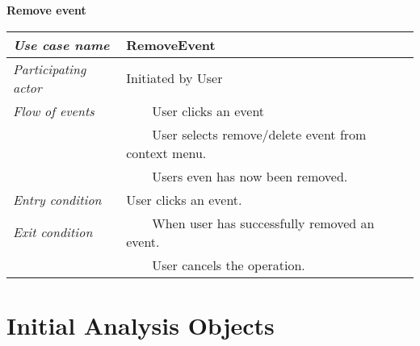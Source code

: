 \documentclass[10pt]{report}
\newcommand{\tabitem}{~~\llap{\textbullet}~~}
\numberwithin{equation}{section} %
\numberwithin{figure}{section} %
\numberwithin{table}{section} %
\begin{document}
\begin{table}[H]
\noindent \textbf{Remove event}\\
\begin{tabularx}{\textwidth}{l X}
\midrule
\textit{Use case name} & RemoveEvent \\ \midrule
\textit{Participating actor} & Initiated by User \\ \midrule
\textit{Flow of events} & \tabitem User clicks an event\\
                                       & \tabitem User selects remove/delete
                                       event from context menu.\\
                                       & \tabitem Users even has now been removed.\\
                        \midrule
\textit{Entry condition} & User clicks an event.\\ \midrule
\textit{Exit condition} & \tabitem When user has successfully removed an event. \\
						& \tabitem User cancels the operation.\\
                        \midrule
\end{tabularx}
\end{table}

\section{Initial Analysis Objects}
\end{document}

